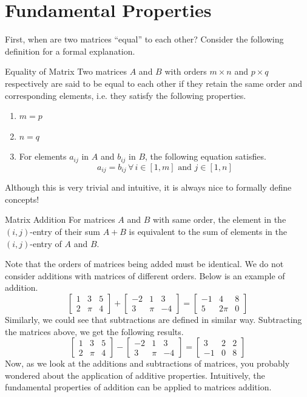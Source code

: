 \documentclass[../main.tex]{subfiles}
\begin{document}
\section{Fundamental Properties}

First, when are two matrices ``equal'' to each other? Consider
the following definition for a formal explanation.

\begin{theorem}{}{Equality of Matrix}
Two matrices $A$ and $B$ with orders $m \times n$ and $p \times q$
respectively are said to be equal to each other if they retain
the same order and corresponding elements, i.e. they satisfy the
following properties.
\begin{enumerate}
\item $m = p$
\item $n = q$
\item
For elements $a_{ij}$ in $A$ and $b_{ij}$ in $B$, the following
equation satisfies.
\[
a_{ij} = b_{ij} \,
    \forall \, i \in [1, m] \text{ and } j \in [1, n]
\]
\end{enumerate}
\end{theorem}

Although this is very trivial and intuitive, it is always nice
to formally define concepts!

\begin{theorem}{}{Matrix Addition}
For matrices $A$ and $B$ with same order, the element in the
$(i, j)$-entry of their sum $A + B$ is equivalent to the sum of
elements in the $(i, j)$-entry of $A$ and $B$.
\end{theorem}

Note that the orders of matrices being added must be identical.
We do not consider additions with matrices of different orders.
Below is an example of addition.
\[
\begin{bmatrix}
    1 & 3   & 5 \\
    2 & \pi & 4
\end{bmatrix}
+
\begin{bmatrix}
    -2 & 1   & 3 \\
    3  & \pi & -4
\end{bmatrix}
=
\begin{bmatrix}
    -1 & 4    & 8 \\
    5  & 2\pi & 0
\end{bmatrix}
\]
Similarly, we could see that subtractions are defined in similar
way. Subtracting the matrices above, we get the following results.
\[
\begin{bmatrix}
    1 & 3   & 5 \\
    2 & \pi & 4
\end{bmatrix}
-
\begin{bmatrix}
    -2 & 1   & 3 \\
    3  & \pi & -4
\end{bmatrix}
=
\begin{bmatrix}
    3  & 2 & 2 \\
    -1 & 0 & 8
\end{bmatrix}
\]
Now, as we look at the additions and subtractions of matrices,
you probably wondered about the application of additive properties.
Intuitively, the fundamental properties of addition can be
applied to matrices addition.
\end{document}
